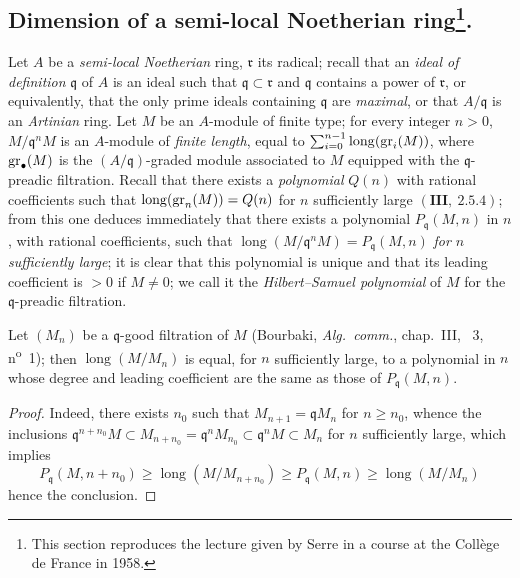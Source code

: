 \subsection[Dimension of a semi-local Noetherian ring]{Dimension of a semi-local Noetherian ring\protect\footnote{This section reproduces the lecture given by Serre in a course at the Collège de France in 1958.}.}
\label{subsection:0.16.2}

\begin{env}[16.2.1]
\label{0.16.2.1}
Let $A$ be a \emph{semi-local Noetherian} ring, $\mathfrak{r}$ its radical; recall that an \emph{ideal of definition} $\mathfrak{q}$ of $A$ is an ideal such that $\mathfrak{q}\subset\mathfrak{r}$ and $\mathfrak{q}$ contains a power of $\mathfrak{r}$, or equivalently, that the only prime ideals containing $\mathfrak{q}$ are \emph{maximal}, or that $A/\mathfrak{q}$ is an \emph{Artinian} ring.
Let $M$ be an $A$-module of finite type; for every integer $n>0$, $M/\mathfrak{q}^n M$ is an $A$-module of \emph{finite length}, equal to $\sum_{i=0}^{n- 1}\operatorname{long}(\operatorname{gr}_i(M))$, where $\operatorname{gr}_\bullet(M)$ is the $(A/\mathfrak{q})$-graded module associated to $M$ equipped with the $\mathfrak{q}$-preadic filtration.
Recall that there exists a \emph{polynomial} $Q(n)$ with rational coefficients such that $\operatorname{long}(\operatorname{gr}_n(M))=Q(n)$ for $n$ sufficiently large $(\mathbf{III},~2.5.4)$; from this one deduces immediately that there exists a polynomial $P_\mathfrak{q}(M,n)$ in $n$, with rational coefficients, such that $\operatorname{long}(M/\mathfrak{q}^n M)=P_\mathfrak{q}(M,n)$ \emph{for $n$ sufficiently large}; it is clear that this polynomial is unique and that its leading coefficient is $>0$ if $M\neq 0$; we call it the \emph{Hilbert--Samuel polynomial} of $M$ for the $\mathfrak{q}$-preadic filtration.
\end{env}


\begin{lemma}[16.2.2.1]
\label{0.16.2.2.1}
Let $(M_n)$ be a $\mathfrak{q}$-good filtration of $M$ \textup{(Bourbaki, \emph{Alg.~comm.}, chap.~III, \textsection~3, n\textsuperscript{o}~1)}; then $\operatorname{long}(M/M_n)$ is equal, for $n$ sufficiently large, to a polynomial in $n$ whose degree and leading coefficient are the same as those of $P_\mathfrak{q}(M,n)$.
\end{lemma}

\begin{proof}
Indeed, there exists $n_0$ such that $M_{n+1}=\mathfrak{q}M_n$ for $n\geq n_0$, whence the inclusions $\mathfrak{q}^{n+n_0}M\subset M_{n+n_0}=\mathfrak{q}^n M_{n_0}\subset\mathfrak{q}^n M\subset M_n$ for $n$ sufficiently large, which implies
\[
  P_\mathfrak{q}(M,n+n_0)\geq\operatorname{long}(M/M_{n+n_0})\geq P_\mathfrak{q}(M,n)\geq\operatorname{long}(M/M_n)
\]
hence the conclusion.
\end{proof}

